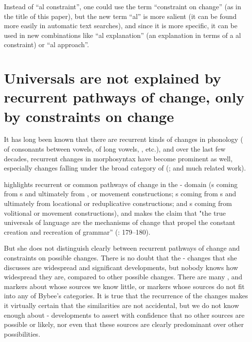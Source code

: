 \documentclass[output=paper]{langsci/langscibook}
\begin{document}
Instead of “al constraint”, one could use the term “constraint on change” (as in the title of this paper), but the new term “al” is more salient (it can be found more easily in automatic text searches), and since it is more specific, it can be used in new combinations like “al explanation” (an explanation in terms of a al constraint) or “al approach”.

\section{Universals are not explained by recurrent pathways of change, only by constraints on change}\label{sec:haspelmath:4}

It has long been known that there are recurrent kinds of changes in phonology ( of consonants between vowels,  of long vowels, , etc.), and over the last few decades, recurrent changes in morphosyntax have become prominent as well, especially changes falling under the broad category of  (\citealt{Lehmann1982,HeineEtAl1991,BybeeEtAl1994}; and much related work).

\citet{Bybee2006} highlights recurrent or common pathways of change in the - domain (s coming from s and ultimately from ,  or movement constructions; s coming from s and ultimately from locational or reduplicative constructions; and s coming from volitional or movement constructions), and makes the claim that "the true universals of language are the mechanisms of change that propel the constant creation and recreation of grammar” (\citealt{Bybee2006}: 179–180).

 
But she does not distinguish clearly between recurrent pathways of change and constraints on possible changes. There is no doubt that the - changes that she discusses are widespread and significant developments, but nobody knows how widespread they are, compared to other possible changes. There are many ,  and  markers about whose sources we know little, or markers whose sources do not fit into any of Bybee’s categories. It is true that the recurrence of the changes makes it virtually certain that the similarities are not accidental, but we do not know enough about - developments to assert with confidence that no other sources are possible or likely, nor even that these sources are clearly predominant over other possibilities. 
 
\end{document}

